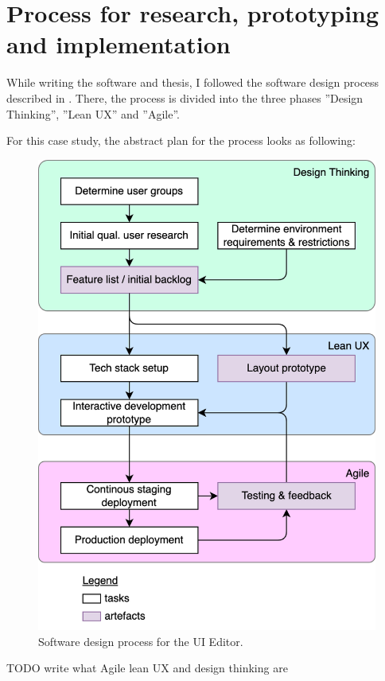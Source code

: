 \newpage
\section{Process for research, prototyping and implementation}

While writing the software and thesis, I followed the software design process described in \cite[p. 104]{LearnHCI:2020ys}.
There, the process is divided into the three phases ''Design Thinking'', ''Lean UX'' and ''Agile''.

For this case study, the abstract plan for the process looks as following:
\begin{figure}[h]
  \includegraphics[width=0.8\linewidth]{pics/process.drawio.png}
  \caption{Software design process for the UI Editor.}
	\label{fig:process}
\end{figure}



TODO write what Agile lean UX and design thinking are